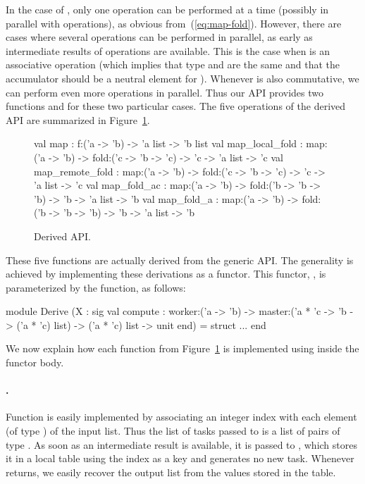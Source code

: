 \documentclass[preprint]{sigplanconf}
\begin{document}
In the case of , only one  operation can
be performed at a time (possibly in parallel with 
operations), as obvious from~(\ref{eq:map-fold}). However, there are
cases where several  operations can be performed in parallel,
as early as intermediate results of  operations are available.
This is the case when  is an associative operation (which
implies that type  and  are the same  and that the
accumulator should be a neutral element for ). Whenever
 is also commutative, we can perform even more 
operations in parallel. Thus our API provides two functions
 and  for these two particular cases.
The five operations of the derived API are summarized
in Figure~\ref{fig:derived}.
\begin{figure}[t]
  \begin{ocaml}
    val map : 
      f:('a -> 'b) -> 'a list -> 'b list 
    val map_local_fold : 
      map:('a -> 'b) -> fold:('c -> 'b -> 'c) -> 
      'c -> 'a list -> 'c 
    val map_remote_fold : 
      map:('a -> 'b) -> fold:('c -> 'b -> 'c) -> 
      'c -> 'a list -> 'c 
    val map_fold_ac : 
      map:('a -> 'b) -> fold:('b -> 'b -> 'b) -> 
      'b -> 'a list -> 'b 
    val map_fold_a : 
      map:('a -> 'b) -> fold:('b -> 'b -> 'b) -> 
      'b -> 'a list -> 'b
  \end{ocaml}
  \caption{Derived API.}
\label{fig:derived}
\end{figure}

These five functions are actually derived from the generic API.  The
generality is achieved by implementing these derivations as a functor.
This functor, , is parameterized by the 
function, as follows:
\begin{ocaml}
module Derive
  (X : sig
     val compute : 
       worker:('a -> 'b) -> 
       master:('a * 'c -> 'b -> ('a * 'c) list) ->
       ('a * 'c) list -> unit
   end) = struct ... end
\end{ocaml}
We now explain how each function from Figure~\ref{fig:derived} is
implemented using  inside the functor body.

\paragraph{.} 
Function  is easily implemented by associating an integer
index with each element (of type ) of the input list. Thus the
list of tasks passed to  is a list of pairs of type .
As soon as an intermediate result is available, it is passed to
, which stores it in a local table using the index as a key
and generates no new task. Whenever  returns, we easily
recover the output list from the values stored in the table.
\end{document}

